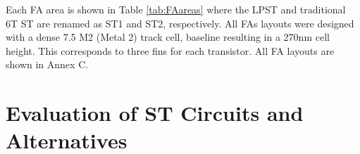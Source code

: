 \documentclass[diss,pgmicro,english]{iiufrgs}
\begin{document}
Each FA area is shown in Table \ref{tab:FAareas} where the LPST and traditional 6T ST are renamed as ST1 and ST2, respectively. All FAs layouts were designed with a dense 7.5 M2 (Metal 2) track cell, baseline resulting in a 270nm cell height. This corresponds to three fins for each transistor. All FA layouts are shown in Annex C.

\begin{table}[H]
\centering
\caption{Each Full Adder area with the ST technique applied where ST1 and ST2 corresponds to the LPST and 6T ST, respectively.}
\label{tab:FAareas}
\end{table}



\chapter{Evaluation of ST Circuits and Alternatives}
\end{document}
